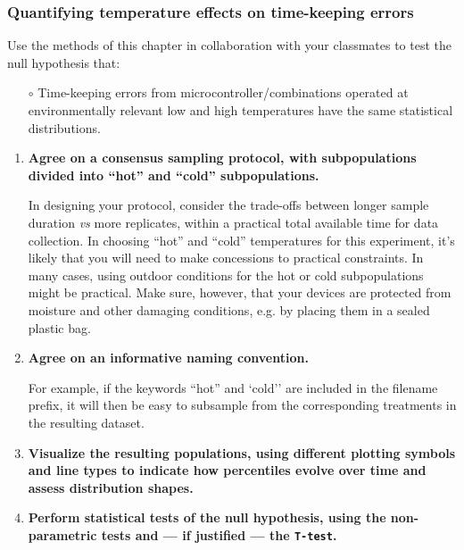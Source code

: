 \subsubsection{\howto Quantifying temperature effects on time-keeping errors}
Use the methods of this chapter in collaboration with your classmates to test the null hypothesis that:
\begin{itemize}
	\item[$\circ$] Time-keeping errors from microcontroller/\rtc combinations operated at environmentally relevant low and high temperatures have the same statistical distributions.
\end{itemize}
\begin{enumerate}
	\item \textbf{Agree on a consensus sampling protocol, with subpopulations divided into ``hot'' and ``cold'' subpopulations.}
	
	In designing your protocol, consider the trade-offs between longer sample duration \textit{vs} more replicates, within a practical total available time for data collection.
	In choosing ``hot'' and ``cold'' temperatures for this experiment, it's likely that you will need to make concessions to practical constraints.
	In many cases, using outdoor conditions for the hot or cold subpopulations might be practical.
	Make sure, however, that your devices are protected from moisture and other damaging conditions, e.g. by placing them in a sealed plastic bag. 
	
	\item \textbf{Agree on an informative naming convention.}
	
	For example, if the keywords ``hot'' and `cold'' are included in the filename prefix, it will then be easy to subsample from the corresponding treatments in the resulting dataset.
	 
	\item \textbf{Visualize the resulting populations, using different plotting symbols and line types to indicate how percentiles evolve over time and assess distribution shapes.}
	\item \textbf{Perform statistical tests of the null hypothesis, using the non-parametric tests and --- if justified --- the \texttt{T-test}.}
	
	
\end{enumerate}

